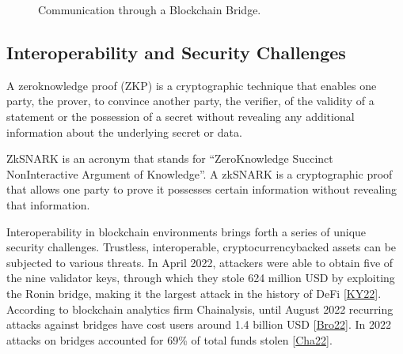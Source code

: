 \documentclass[letterpaper,10pt,english]{jupyterBook}
\let\sphinxpxdimen\pdfpxdimen\else\newdimen\sphinxpxdimen
\begin{document}
\begin{figure}[htbp]
\centering
\capstart

\noindent\sphinxincludegraphics[width=780\sphinxpxdimen,height=456\sphinxpxdimen]{{BSecurity4.drawio}.png}
\caption{Communication through a Blockchain Bridge.}\label{\detokenize{BBSecurity/bbsecurity:bridge-security}}\end{figure}


\subsection{Interoperability and Security Challenges}
\label{\detokenize{BBSecurity/bbsecurity:interoperability-and-security-challenges}}
\begin{sphinxShadowBox}

\sphinxAtStartPar
A zero\sphinxhyphen{}knowledge proof (ZKP) is a cryptographic technique that enables one party, the prover, to convince another party, the verifier, of the validity of a statement or the possession of a secret without revealing any additional information about the underlying secret or data.
\end{sphinxShadowBox}

\begin{sphinxShadowBox}

\sphinxAtStartPar
Zk\sphinxhyphen{}SNARK is an acronym that stands for “Zero\sphinxhyphen{}Knowledge Succinct Non\sphinxhyphen{}Interactive Argument of Knowledge”. A zk\sphinxhyphen{}SNARK is a cryptographic proof that allows one party to prove it possesses certain information without revealing that information.
\end{sphinxShadowBox}

\sphinxAtStartPar
Interoperability in blockchain environments brings forth a series of unique security challenges. Trustless, interoperable, cryptocurrency\sphinxhyphen{}backed assets can be subjected to various threats. In April 2022, attackers were able to obtain five of the nine validator keys, through which they stole 624 million USD by exploiting the Ronin bridge, making it the largest attack in the history of DeFi {[}\hyperlink{cite.BBSecurity/bbsecurity:id101}{KY22}{]}. According to blockchain analytics firm Chainalysis, until August 2022 recurring attacks against bridges have cost users around 1.4 billion USD {[}\hyperlink{cite.BBSecurity/bbsecurity:id100}{Bro22}{]}. In 2022 attacks on bridges accounted for 69\% of total funds stolen {[}\hyperlink{cite.BBSecurity/bbsecurity:id88}{Cha22}{]}.
\end{document}
